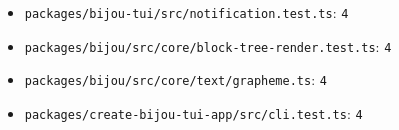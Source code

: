 \begin{itemize}
\item
  \texttt{p\allowbreak{}a\allowbreak{}c\allowbreak{}k\allowbreak{}a\allowbreak{}g\allowbreak{}e\allowbreak{}s\allowbreak{}/\allowbreak{}b\allowbreak{}i\allowbreak{}j\allowbreak{}o\allowbreak{}u\allowbreak{}-\allowbreak{}t\allowbreak{}u\allowbreak{}i\allowbreak{}/\allowbreak{}s\allowbreak{}r\allowbreak{}c\allowbreak{}/\allowbreak{}n\allowbreak{}o\allowbreak{}t\allowbreak{}i\allowbreak{}f\allowbreak{}i\allowbreak{}c\allowbreak{}a\allowbreak{}t\allowbreak{}i\allowbreak{}o\allowbreak{}n\allowbreak{}.\allowbreak{}t\allowbreak{}e\allowbreak{}s\allowbreak{}t\allowbreak{}.\allowbreak{}t\allowbreak{}s}: \texttt{4}
\item
  \texttt{p\allowbreak{}a\allowbreak{}c\allowbreak{}k\allowbreak{}a\allowbreak{}g\allowbreak{}e\allowbreak{}s\allowbreak{}/\allowbreak{}b\allowbreak{}i\allowbreak{}j\allowbreak{}o\allowbreak{}u\allowbreak{}/\allowbreak{}s\allowbreak{}r\allowbreak{}c\allowbreak{}/\allowbreak{}c\allowbreak{}o\allowbreak{}r\allowbreak{}e\allowbreak{}/\allowbreak{}b\allowbreak{}l\allowbreak{}o\allowbreak{}c\allowbreak{}k\allowbreak{}-\allowbreak{}t\allowbreak{}r\allowbreak{}e\allowbreak{}e\allowbreak{}-\allowbreak{}r\allowbreak{}e\allowbreak{}n\allowbreak{}d\allowbreak{}e\allowbreak{}r\allowbreak{}.\allowbreak{}t\allowbreak{}e\allowbreak{}s\allowbreak{}t\allowbreak{}.\allowbreak{}t\allowbreak{}s}: \texttt{4}
\item
  \texttt{p\allowbreak{}a\allowbreak{}c\allowbreak{}k\allowbreak{}a\allowbreak{}g\allowbreak{}e\allowbreak{}s\allowbreak{}/\allowbreak{}b\allowbreak{}i\allowbreak{}j\allowbreak{}o\allowbreak{}u\allowbreak{}/\allowbreak{}s\allowbreak{}r\allowbreak{}c\allowbreak{}/\allowbreak{}c\allowbreak{}o\allowbreak{}r\allowbreak{}e\allowbreak{}/\allowbreak{}t\allowbreak{}e\allowbreak{}x\allowbreak{}t\allowbreak{}/\allowbreak{}g\allowbreak{}r\allowbreak{}a\allowbreak{}p\allowbreak{}h\allowbreak{}e\allowbreak{}m\allowbreak{}e\allowbreak{}.\allowbreak{}t\allowbreak{}s}: \texttt{4}
\item
  \texttt{p\allowbreak{}a\allowbreak{}c\allowbreak{}k\allowbreak{}a\allowbreak{}g\allowbreak{}e\allowbreak{}s\allowbreak{}/\allowbreak{}c\allowbreak{}r\allowbreak{}e\allowbreak{}a\allowbreak{}t\allowbreak{}e\allowbreak{}-\allowbreak{}b\allowbreak{}i\allowbreak{}j\allowbreak{}o\allowbreak{}u\allowbreak{}-\allowbreak{}t\allowbreak{}u\allowbreak{}i\allowbreak{}-\allowbreak{}a\allowbreak{}p\allowbreak{}p\allowbreak{}/\allowbreak{}s\allowbreak{}r\allowbreak{}c\allowbreak{}/\allowbreak{}c\allowbreak{}l\allowbreak{}i\allowbreak{}.\allowbreak{}t\allowbreak{}e\allowbreak{}s\allowbreak{}t\allowbreak{}.\allowbreak{}t\allowbreak{}s}: \texttt{4}

\end{itemize}
